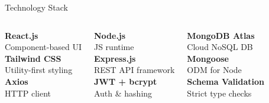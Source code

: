 \documentclass[aspectratio=169]{beamer}
\begin{document}
\begin{frame}{Technology Stack}{}
  \begin{columns}[t]
    \begin{tcolorbox}[infobox, title={\color{white}\small\bfseries\faCode\ Frontend},
        colbacktitle=TealPrimary, height=4.2cm]
      \textbf{React.js}\\
      {\tiny Component-based UI}\\[5pt]
      \textbf{Tailwind CSS}\\
      {\tiny Utility-first styling}\\[5pt]
      \textbf{Axios}\\
      {\tiny HTTP client}
    \end{tcolorbox}

    \begin{tcolorbox}[infobox, title={\color{white}\small\bfseries\faServer\ Backend},
        colbacktitle=TealPrimary, height=4.2cm]
      \textbf{Node.js}\\
      {\tiny JS runtime}\\[5pt]
      \textbf{Express.js}\\
      {\tiny REST API framework}\\[5pt]
      \textbf{JWT + bcrypt}\\
      {\tiny Auth \& hashing}
    \end{tcolorbox}

    \begin{tcolorbox}[infobox, title={\color{white}\small\bfseries\faDatabase\ Database},
        colbacktitle=TealPrimary, height=4.2cm]
      \textbf{MongoDB Atlas}\\
      {\tiny Cloud NoSQL DB}\\[5pt]
      \textbf{Mongoose}\\
      {\tiny ODM for Node}\\[5pt]
      \textbf{Schema Validation}\\
      {\tiny Strict type checks}
    \end{tcolorbox}


\end{columns}
\end{frame}
\end{document}
